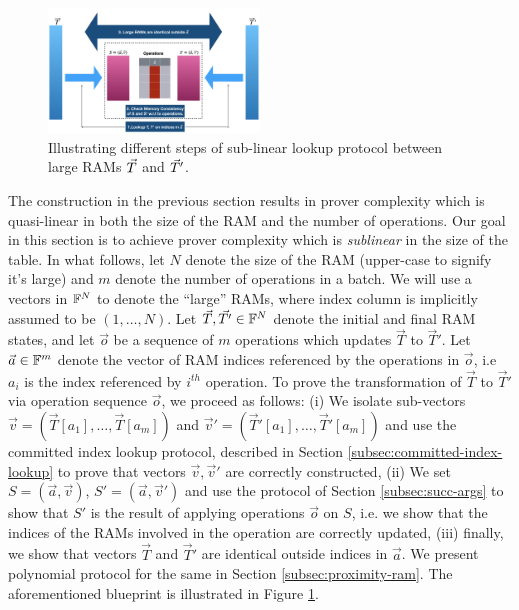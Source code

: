 \begin{figure}[htbp]
    \centering
    \includegraphics[width=0.5\textwidth]{RAM-Lookup}
    \caption{Illustrating different steps of sub-linear lookup protocol between large RAMs $\vec{T}$ and $\vec{T}'$.}
    \label{fig:blueprint}
\end{figure}

The construction in the previous section results in prover complexity which is quasi-linear in both the
size of the RAM and the number of operations.
Our goal in this section is to achieve prover complexity which is {\em sublinear} in the size of the table. In
what follows, let $N$ denote the size of the RAM (upper-case to signify it's large) and $m$ denote the number
of operations in a batch. We will use a vectors in $\mathbb{F}^N$ to denote the ``large'' RAMs, where index column is implicitly
assumed to be $(1,\ldots,N)$.
Let $\vec{T},\vec{T'}\in \mathbb{F}^N$ denote the initial and final RAM states, and let $\vec{o}$ be
a sequence of $m$ operations which updates $\vec{T}$ to $\vec{T}'$. Let $\vec{a}\in \mathbb{F}^m$ denote the vector
of RAM indices referenced by the operations in $\vec{o}$, i.e $a_i$ is the index referenced by $i^{th}$ operation.
To prove the transformation of $\vec{T}$ to $\vec{T}'$ via operation sequence $\vec{o}$, we proceed as follows:
(i) We isolate sub-vectors $\vec{v}=(\vec{T}[a_1],\ldots,\vec{T}[a_m])$ and
$\vec{v}'=(\vec{T}'[a_1],\ldots,\vec{T}'[a_m])$ and use the committed index lookup protocol, described in
Section \ref{subsec:committed-index-lookup} to prove that vectors $\vec{v},\vec{v}'$ are correctly constructed,
(ii) We set $S=(\vec{a},\vec{v})$, $S'=(\vec{a},\vec{v}')$ and use the protocol of Section \ref{subsec:succ-args} to show
that $S'$ is the result of applying operations $\vec{o}$ on $S$, i.e. we show that the indices of the RAMs involved in the operation
are correctly updated, (iii) finally, we show that vectors $\vec{T}$ and $\vec{T}'$ are identical outside indices in $\vec{a}$.
We present polynomial protocol for the same in Section \ref{subsec:proximity-ram}. The aforementioned blueprint is illustrated
in Figure \ref{fig:blueprint}.

